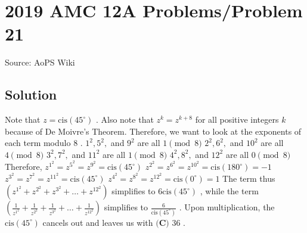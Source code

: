 \documentclass[12pt]{article}
\begin{document}
\section*{{2019 AMC 12A Problems/Problem 21}}
Source: AoPS Wiki

\subsection*{Solution}
Note that $z = \mathrm{cis }(45^{\circ})$ . Also note that $z^{k} = z^{k + 8}$ for all positive integers $k$ because of De Moivre's Theorem. Therefore, we want to look at the exponents of each term modulo $8$ . $1^2, 5^2,$ and $9^2$ are all $1 \pmod{8}$ $2^2, 6^2,$ and $10^2$ are all $4 \pmod{8}$ $3^2, 7^2,$ and $11^2$ are all $1 \pmod{8}$ $4^2, 8^2,$ and $12^2$ are all $0 \pmod{8}$ Therefore, $z^{1^2} = z^{5^2} = z^{9^2} = \mathrm{cis }(45^{\circ})$ $z^{2^2} = z^{6^2} = z^{10^2} = \mathrm{cis }(180^{\circ}) = -1$ $z^{3^2} = z^{7^2} = z^{11^2} = \mathrm{cis }(45^{\circ})$ $z^{4^2} = z^{8^2} = z^{12^2} = \mathrm{cis }(0^{\circ}) = 1$ The term thus $\left(z^{1^2}+z^{2^2}+z^{3^2}+\dots+z^{{12}^2}\right)$ simplifies to $6\mathrm{cis }(45^{\circ})$ , while the term $\left(\frac{1}{z^{1^2}}+\frac{1}{z^{2^2}}+\frac{1}{z^{3^2}}+\dots+\frac{1}{z^{{12}^2}}\right)$ simplifies to $\frac{6}{\mathrm{cis }(45^{\circ})}$ . Upon multiplication, the $\mathrm{cis }(45^{\circ})$ cancels out and leaves us with $\boxed{\textbf{(C) }36}$ .
\end{document}

